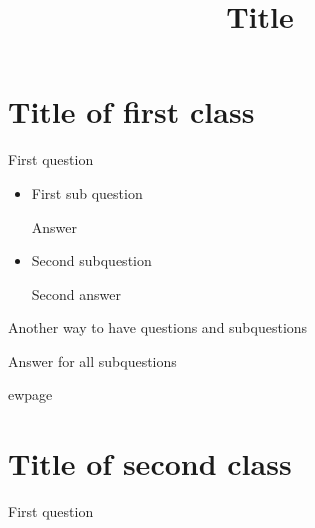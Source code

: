 \documentclass[12pt]{exam}		%
\title{Title}
\begin{document}
\section{Title of first class}
\begin{questions}
	\question First question
	
		\begin{itemize}
			\item First sub question
				\begin{solution}
					Answer
				\end{solution}
			\item Second subquestion
				\begin{solution}
    				Second answer
				\end{solution}
		\end{itemize}
	\question Another way to have questions and subquestions
		\begin{solution}
    		Answer for all subquestions
		\end{solution}
\end{questions}


ewpage
\section{Title of second class}
\begin{questions}
	\question First question
\end{questions}
				
\end{document}
